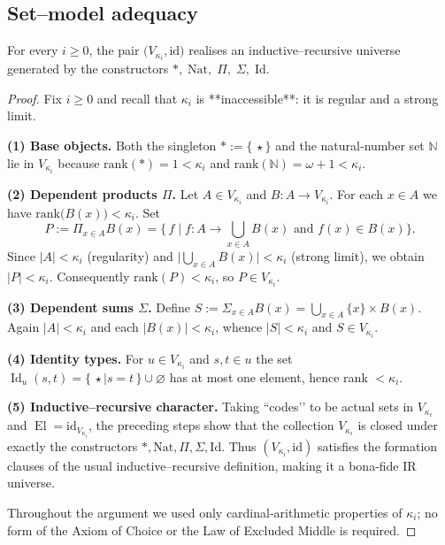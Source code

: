 \documentclass[a4paper,11pt]{article}
\newcommand{\El}{\operatorname{El}}          %
\begin{document}
\subsection{Set–model adequacy}
\begin{lemma}\label{lem:set-adequacy}
For every $i\ge 0$, the pair
\(
  \bigl(V_{\kappa_i},\mathrm{id}\bigr)
\)
realises an inductive–recursive universe generated by the
constructors
\(
  \ast,\;\mathrm{Nat},\;\Pi,\;\Sigma,\;\mathrm{Id}.
\)
\end{lemma}
\begin{proof}
Fix $i\ge 0$ and recall that $\kappa_i$ is **inaccessible**: it is
regular and a strong limit.

\medskip\noindent
\textbf{(1) Base objects.}
Both the singleton $\ast:=\{\,\star\!\}$ and the natural‐number set
$\mathbb N$ lie in $V_{\kappa_i}$ because
\(
  \mathrm{rank}(\ast)=1<\kappa_i
\)
and
\(
  \mathrm{rank}(\mathbb N)=\omega+1<\kappa_i .
\)

\medskip\noindent
\textbf{(2) Dependent products \(\Pi\).}
Let $A\in V_{\kappa_i}$ and $B:A\to V_{\kappa_i}$.
For each $x\in A$ we have $\mathrm{rank}\bigl(B(x)\bigr)<\kappa_i$.
Set
\[
  P:=\Pi_{x\in A}B(x)
     =\bigl\{\,f\mid f:A \to \bigcup_{x\in A}B(x)
               \text{ and } f(x)\in B(x)\bigr\}.
\]
Since $|A|<\kappa_i$ (regularity) and
\(
  \bigl|\bigcup_{x\in A}B(x)\bigr|<\kappa_i
\)
(strong limit), we obtain
\(
  |P|<\kappa_i .
\)
Consequently $\mathrm{rank}(P)<\kappa_i$, so
\(P\in V_{\kappa_i}\).

\medskip\noindent
\textbf{(3) Dependent sums \(\Sigma\).}
Define
\(
  S:=\Sigma_{x\in A}B(x)=\bigcup_{x\in A}\{x\}\times B(x).
\)
Again $|A|<\kappa_i$ and each $|B(x)|<\kappa_i$, whence
$|S|<\kappa_i$ and
\(
  S\in V_{\kappa_i}.
\)

\medskip\noindent
\textbf{(4) Identity types.}
For $u\in V_{\kappa_i}$ and $s,t\in u$ the set
\(
  \operatorname{Id}_u(s,t)=
  \{\,\star\mid s=t\,\}\cup\varnothing
\)
has at most one element, hence rank $<\kappa_i$.

\medskip\noindent
\textbf{(5) Inductive–recursive character.}
Taking “codes’’ to be actual sets in $V_{\kappa_i}$ and
$\El=\mathrm{id}_{V_{\kappa_i}}$, the preceding steps show that the
collection $V_{\kappa_i}$ is closed under exactly the constructors
$\ast, \mathrm{Nat}, \Pi, \Sigma, \mathrm{Id}$.  
Thus $(V_{\kappa_i},\mathrm{id})$ satisfies the formation clauses of
the usual inductive–recursive definition, making it a bona-fide IR
universe.

\medskip
Throughout the argument we used only cardinal‐arithmetic properties of
$\kappa_i$; no form of the Axiom of Choice or the Law of Excluded
Middle is required.
\end{proof}
\end{document}
